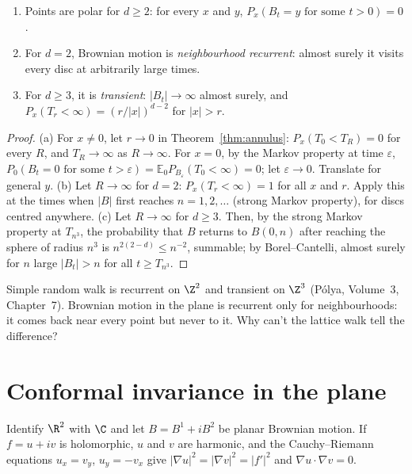 \begin{corollary}\label{cor:recurrence}
\begin{enumerate}[label=(\alph*)]
\item Points are polar for $d\ge2$: for every $x$ and $y$, $P_x(B_t=y\text{ for some }t>0)=0$.
\item For $d=2$, Brownian motion is \emph{neighbourhood recurrent}: almost surely it visits every disc at arbitrarily large times.
\item For $d\ge3$, it is \emph{transient}: $|B_t|\to\infty$ almost surely, and $P_x(T_r<\infty)=(r/|x|)^{d-2}$ for $|x|>r$.
\end{enumerate}
\end{corollary}

\begin{proof}
(a) For $x\ne0$, let $r\to0$ in Theorem~\ref{thm:annulus}: $P_x(T_0<T_R)=0$ for every $R$, and $T_R\to\infty$ as $R\to\infty$. For $x=0$, by the Markov property at time $\varepsilon$, $P_0(B_t=0\text{ for some }t>\varepsilon)=\mathbb E_0P_{B_\varepsilon}(T_0<\infty)=0$;
let $\varepsilon\to0$. Translate for general $y$. (b) Let $R\to\infty$ for $d=2$: $P_x(T_r<\infty)=1$ for all $x$ and $r$. Apply this at the times when $|B|$ first reaches $n=1,2,\dots$ (strong Markov property), for discs
centred anywhere. (c) Let $R\to\infty$ for $d\ge3$. Then, by the strong Markov property at $T_{n^3}$, the probability that $B$ returns to $B(0,n)$ after reaching the sphere of radius $n^3$ is $n^{2(2-d)}\le n^{-2}$, summable;
by Borel--Cantelli, almost surely for $n$ large $|B_t|>n$ for all $t\ge T_{n^3}$.
\end{proof}

\begin{think}
Simple random walk is recurrent on $\Z^2$ and transient on $\Z^3$ (P\'olya, Volume~3, Chapter~7). Brownian motion in the plane is recurrent only for neighbourhoods: it comes back near every point but never to it. Why
can't the lattice walk tell the difference?
\end{think}

\section{Conformal invariance in the plane}

Identify $\R^2$ with $\C$ and let $B=B^1+iB^2$ be planar Brownian motion. If $f=u+iv$ is holomorphic, $u$ and $v$ are harmonic, and the Cauchy--Riemann equations $u_x=v_y$, $u_y=-v_x$ give
$|\nabla u|^2=|\nabla v|^2=|f'|^2$ and $\nabla u\cdot\nabla v=0$.

